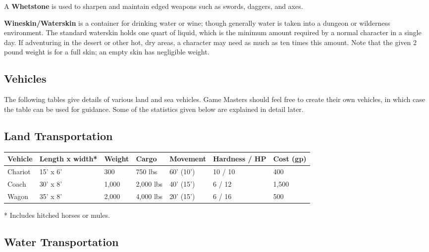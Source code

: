 \documentclass[a4paper,twoside,openany,10pt]{book}
\begin{document}
\begin{multicols}{2}
A \textbf{Whetstone} is used to sharpen and maintain edged weapons such as swords, daggers, and axes.\smallskip

\textbf{Wineskin/Waterskin} is a container for drinking water or wine; though generally water is taken into a dungeon or wilderness environment. The standard waterskin holds one quart of liquid, which is the minimum amount required by a normal character in a single day. If adventuring in the desert or other hot, dry areas, a character may need as much as ten times this amount. Note that the given 2 pound weight is for a full skin; an empty skin has negligible weight.

\end{multicols}

\pagebreak

\subsection{Vehicles}\label{vehicles}

The following tables give details of various land and sea vehicles. Game Masters should feel free to create their own vehicles, in which case the table can be used for guidance. Some of the statistics given below are explained in detail later.

\subsection{Land Transportation}\label{land-transportation}

\begin{tabular*}{1\linewidth}{@{\extracolsep{\fill}}lllllll}
\textbf{Vehicle} &\textbf{ Length x width*} & \textbf{Weight} & \textbf{Cargo} & \textbf{Movement} & \textbf{Hardness / HP} & \textbf{Cost (gp)}\\\toprule
Chariot & 15'{} x 6'{} & 300 & 750 lbs & 60'{} (10') & 10 / 10 & 400 \\\hline
Coach & 30'{} x 8'{} & 1,000 & 2,000 lbs & 40'{} (15') & 6 / 12 & 1,500 \\\hline
Wagon & 35'{} x 8'{} & 2,000 & 4,000 lbs &20'{} (15') & 6 / 16 & 500 \\\bottomrule
\end{tabular*}

* Includes hitched horses or mules.

\subsection{Water Transportation}\label{water-transportation}
\end{document}
